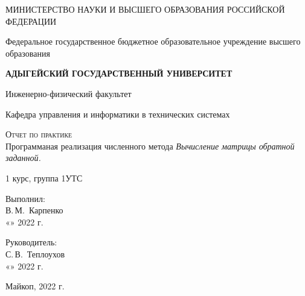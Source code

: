 \documentclass[12pt,a4paper]{scrartcl}
\begin{document}
	\begin{titlepage}
		\begin{center}
			\large
			МИНИСТЕРСТВО НАУКИ И ВЫСШЕГО ОБРАЗОВАНИЯ РОССИЙСКОЙ ФЕДЕРАЦИИ
			
			Федеральное государственное бюджетное образовательное учреждение высшего образования
			
			\textbf{АДЫГЕЙСКИЙ ГОСУДАРСТВЕННЫЙ УНИВЕРСИТЕТ}
			\vspace{0.25cm}
			
			Инженерно-физический факультет
			
			Кафедра управления и информатики в технических системах
			\vfill
			
			\vfill
			
			\textsc{Отчет по практике}\\[5mm]
			
			{\LARGE Программаная реализация численного метода \textit{Вычисление матрицы обратной заданной.}}
			\bigskip
			
			1 курс, группа 1УТС
		\end{center}
		\vfill
		
		\newlength{\ML}
		\hfill\begin{minipage}{0.5\textwidth}
			Выполнил:\\
			\underline{\hspace{\ML}} В.\,М.~Карпенко\\
			«\underline{\hspace{0.7cm}}» \underline{\hspace{2cm}} 2022 г.
		\end{minipage}%
		\bigskip
		
		\hfill\begin{minipage}{0.5\textwidth}
			Руководитель:\\
			\underline{\hspace{\ML}} С.\,В.~Теплоухов\\
			«\underline{\hspace{0.7cm}}» \underline{\hspace{2cm}} 2022 г.
		\end{minipage}%
		\vfill
		
		\begin{center}
			Майкоп, 2022 г.
		\end{center}
	\end{titlepage}
\end{document}
